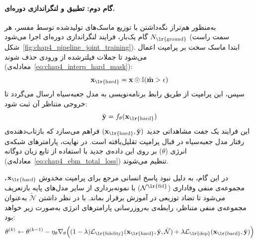 \paragraph{گام دوم: تطبیق و لنگراندازی دوره‌ای.}
به‌منظور هم‌تراز نگه‌داشتن  با توزیع ماسک‌های تولیدشده توسط مفسر، هر $N_{\text{\lr{ground}}}$ گام یک‌بار، فرایند لنگراندازی دوره‌ای اجرا می‌شود (سمت راست شکل~\ref{fig:chap4_pipeline_joint_training}). ابتدا ماسک سخت بر پرامپت اعمال می‌شود تا جملات فیلترشده از ورودی حذف شوند (معادله‌ی~\ref{eq:chap4_interp_hard_mask}):
\begin{equation*}
    \mathbf{x}_{\text{\lr{hard}}} = \mathbf{x} \odot \mathbb{I}(\hat{\mathbf{m}} > \epsilon)
\end{equation*}
سپس، این پرامپت از طریق رابط برنامه‌نویسی به مدل جعبه‌سیاه ارسال می‌گردد تا خروجی متناظر آن ثبت شود:
\begin{equation}\label{eq:chap4_query_llm}
    \tilde{\mathbf{y}} = f_\theta(\mathbf{x}_{\text{\lr{hard}}})
\end{equation}
این فرایند یک جفت مشاهداتی جدید $(\mathbf{x}_{\text{\lr{hard}}}, \tilde{\mathbf{y}})$ فراهم می‌سازد که بازتاب‌دهنده‌ی رفتار مدل جعبه‌سیاه در قبال پرامپت تقلیل‌یافته است. در نهایت، پارامترهای شبکه‌ی انرژی ($\theta$) بر روی این داده‌ی جدید با استفاده از تابع زیان دوگانه (معادله‌ی~\ref{eq:chap4_ebm_total_loss}) تنظیم می‌شوند.

در این گام، به دلیل نبود پاسخ انسانی مرجع برای پرامپت مخدوش $\mathbf{x}_{\text{\lr{hard}}}$، مجموعه‌ی منفی وفاداری ($\mathcal{N}^{\text{\lr{fid}}}$) با نمونه‌برداری از سایر مدل‌های پایه بازتعریف می‌شود تا تضاد توزیعی در آموزش  برقرار بماند. با در نظر داشتن $\tilde{\mathcal{N}}$ به‌عنوان مجموعه‌ی منفی متناظر، رابطه‌ی به‌روزرسانی پارامترهای انرژی به‌صورت زیر خواهد بود:
\begin{equation}\label{eq:chap4_update_ebm}\vspace{0.05cm}
    \theta^{(k)} \leftarrow \theta^{(k-1)} - \eta_{\theta} \nabla_\theta \Big( (1-\lambda)\mathcal{L}_{\text{\lr{fidelity}}}(\mathbf{x}_{\text{\lr{hard}}}, \tilde{\mathbf{y}}, \tilde{\mathcal{N}}) + \lambda\mathcal{L}_{\text{\lr{dep}}}(\mathbf{x}_{\text{\lr{hard}}}, \tilde{\mathbf{y}}) \Big)
\end{equation}


